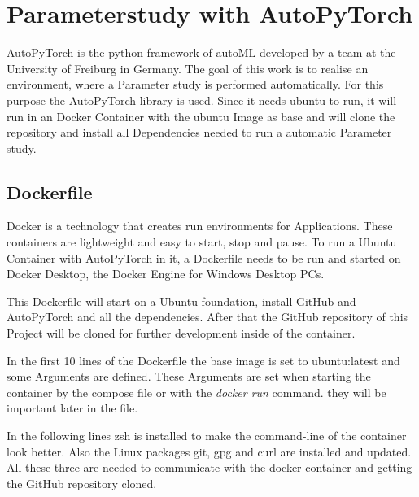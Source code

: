 \documentclass[a4paper, 12pt, oneside]{scrbook}
\begin{document}
		\section{Parameterstudy with AutoPyTorch}
		
		\noindent AutoPyTorch is the python framework of autoML developed by a team at the University of Freiburg in Germany. The goal of this work is to realise an environment, where a Parameter study is performed automatically. For this purpose the AutoPyTorch library is used. Since it needs ubuntu to run, it will run in an Docker Container with the ubuntu Image as base and will clone the repository and install all Dependencies needed to run a automatic Parameter study.
		
		\subsection{Dockerfile}
		
		\noindent Docker is a technology that creates run environments for Applications. These containers are lightweight and easy to start, stop and pause. To run a Ubuntu Container with AutoPyTorch in it, a Dockerfile needs to be run and started on Docker Desktop, the Docker Engine for Windows Desktop PCs.
		
		\noindent This Dockerfile will start on a Ubuntu foundation, install GitHub and AutoPyTorch and all the dependencies. After that the GitHub repository of this Project will be cloned for further development inside of the container. 
		
		\noindent In the first 10 lines of the Dockerfile the base image is set to ubuntu:latest and some Arguments are defined. These Arguments are set when starting the container by the compose file or with the \textit{docker run} command. they will be important later in the file. 
		
		
		\noindent 
		
		\noindent In the following lines zsh is installed to make the command-line of the container look better. Also the Linux packages git, gpg and curl are installed and updated. All these three are needed to communicate with the docker container and getting the GitHub repository cloned.
		
		\noindent 
		
\end{document}
